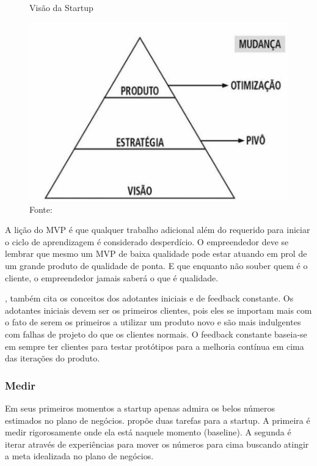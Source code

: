 \begin{figure}[H]
\caption{Visão da Startup}
\centerline{\includegraphics[scale=0.2]{img/pivotar}}
\label{fig:pivotar}
\caption* {Fonte: }
\end{figure}

A lição do MVP é que qualquer trabalho adicional além do requerido para iniciar o ciclo de aprendizagem é considerado desperdício. O empreendedor deve se lembrar que mesmo um MVP de baixa qualidade pode estar atuando em prol de um grande produto de qualidade de ponta. E que enquanto não souber quem é o cliente, o empreendedor jamais saberá o que é qualidade. \cite{leanstartup}

, também cita os conceitos dos adotantes iniciais e de feedback constante. Os adotantes iniciais devem ser os primeiros clientes, pois eles se importam mais com o fato de serem os primeiros a utilizar um produto novo e são mais indulgentes com falhas de projeto do que os clientes normais. O feedback constante baseia-se em sempre ter clientes para testar protótipos para a melhoria contínua em cima das iterações do produto.

\subsubsection{Medir}
\label{cha:medir}

Em seus primeiros momentos a startup apenas admira os belos números estimados no plano de negócios.  propõe duas tarefas para a startup. A primeira é medir rigorosamente onde ela está naquele momento (baseline). A segunda é iterar através de experiências para mover os números para cima buscando atingir a meta idealizada no plano de negócios.

